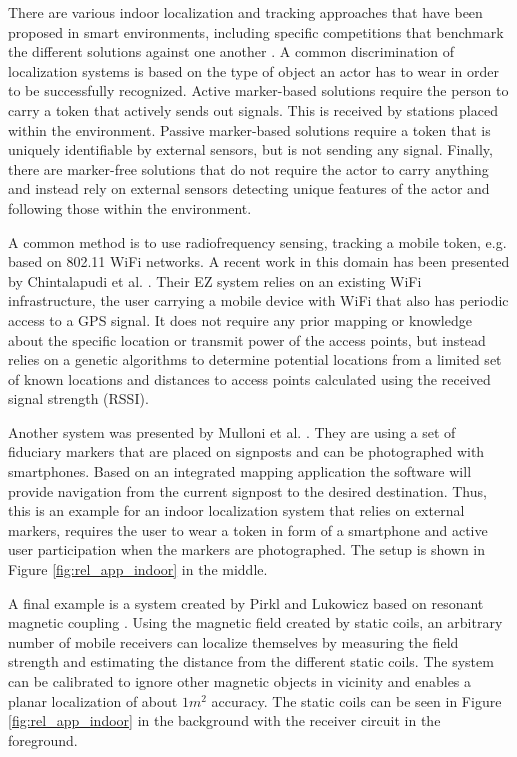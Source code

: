 There are various indoor localization and tracking approaches that have been proposed in smart environments, including specific competitions that benchmark the different solutions against one another \cite{chessa_eval}. A common discrimination of localization systems is based on the type of object an actor has to wear in order to be successfully recognized. Active marker-based solutions require the person to carry a token that actively sends out signals. This is received by stations placed within the environment. Passive marker-based solutions require a token that is uniquely identifiable by external sensors, but is not sending any signal. Finally, there are marker-free solutions that do not require the actor to carry anything and instead rely on external sensors detecting unique features of the actor and following those within the environment. 

A common method is to use radiofrequency sensing, tracking a mobile token, e.g. based on 802.11 WiFi networks. A recent work in this domain has been presented by Chintalapudi et al. \cite{chintalapudi2010indoor}. Their EZ system relies on an existing WiFi infrastructure, the user carrying a mobile device with WiFi that also has periodic access to a GPS signal. It does not require any prior mapping or knowledge about the specific location or transmit power of the access points, but instead relies on a genetic algorithms to determine potential locations from a limited set of known locations and distances to access points calculated using the received signal strength (RSSI). 

Another system was presented by Mulloni et al. \cite{mulloni2009indoor}. They are using a set of fiduciary markers that are placed on signposts and can be photographed with smartphones. Based on an integrated mapping application the software will provide navigation from the current signpost to the desired destination. Thus, this is an example for an indoor localization system that relies on external markers, requires the user to wear a token in form of a smartphone and active user participation when the markers are photographed. The setup is shown in Figure \ref{fig:rel_app_indoor} in the middle.

A final example is a system created by Pirkl and Lukowicz based on resonant magnetic coupling \cite{pirkl2013resonant}. Using the magnetic field created by static coils, an arbitrary number of mobile receivers can localize themselves by measuring the field strength and estimating the distance from the different static coils. The system can be calibrated to ignore other magnetic objects in vicinity and enables a planar localization of about $1 m^2$ accuracy. The static coils can be seen in Figure \ref{fig:rel_app_indoor} in the background with the receiver circuit in the foreground.


